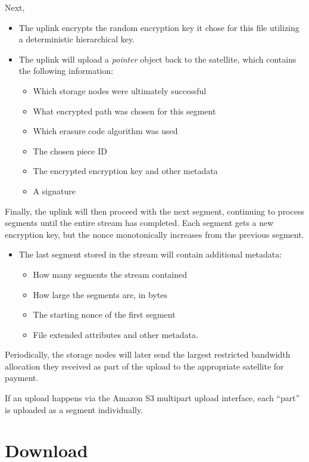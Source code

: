 \documentclass[11pt,fleqn,openany]{book}
\begin{document}
Next,

\begin{itemize}
\item The uplink encrypts the random encryption key it chose for this file
  utilizing a deterministic hierarchical key.
\item The uplink will upload a {\em pointer} object back to the satellite, which
  contains the following information:
  \begin{itemize}
  \item Which storage nodes were ultimately successful
  \item What encrypted path was chosen for this segment
  \item Which erasure code algorithm was used
  \item The chosen piece ID
  \item The encrypted encryption key and other metadata
  \item A signature
  \end{itemize}
\end{itemize}

Finally, the uplink will then proceed with the next segment, continuing to
process segments until the entire stream has completed. Each segment gets
a new encryption key, but the nonce monotonically increases from the previous
segment.

\begin{itemize}
\item The last segment stored in the stream will contain additional metadata:
  \begin{itemize}
  \item How many segments the stream contained
  \item How large the segments are, in bytes
  \item The starting nonce of the first segment
  \item File extended attributes and other metadata.
  \end{itemize}
\end{itemize}

Periodically, the storage nodes will later send the largest restricted
bandwidth allocation they received as part of the upload to the appropriate
satellite for payment.

If an upload happens via the Amazon S3 multipart upload interface, each
``part'' is uploaded as a segment individually.

\section{Download}
\end{document}
